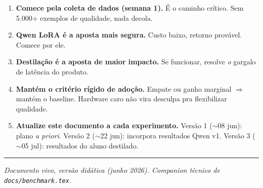 \documentclass[11pt,a4paper]{article}
\newcommand{\file}[1]{\texttt{\small\color{black!75} #1}}
\begin{document}
\begin{enumerate}[leftmargin=*]
\item \textbf{Comece pela coleta de dados (semana 1).} É o caminho
crítico. Sem 5.000+ exemplos de qualidade, nada decola.

\item \textbf{Qwen LoRA é a aposta mais segura.} Custo baixo, retorno
provável. Comece por ele.

\item \textbf{Destilação é a aposta de maior impacto.} Se funcionar,
resolve \emph{o} gargalo de latência do produto.

\item \textbf{Mantém o critério rígido de adoção.} Empate ou ganho
marginal $\Rightarrow$ mantém o baseline. Hardware caro não vira
desculpa pra flexibilizar qualidade.

\item \textbf{Atualize este documento a cada experimento.} Versão 1
($\sim$08 jun): plano \emph{a priori}. Versão 2 ($\sim$22 jun):
incorpora resultados Qwen v1. Versão 3 ($\sim$05 jul): resultados
do aluno destilado.
\end{enumerate}

\bigskip\hrule\smallskip
\noindent\textit{Documento vivo, versão didática (junho 2026).
Companion técnico de \file{docs/benchmark.tex}.}
\end{document}
